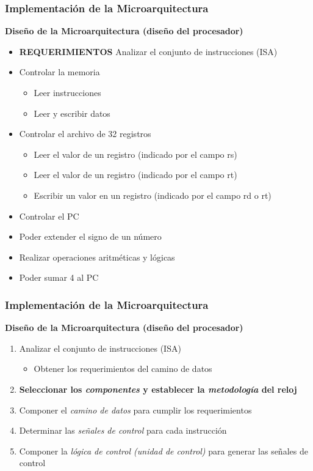 \documentclass[aspectratio=169,compress]{beamer}
\begin{document}
\begin{footnotesize}
\begin{frame}
\frametitle{Implementación de la Microarquitectura}
\begin{center}\textbf{Diseño de la Microarquitectura (diseño del procesador)}\end{center}
\begin{itemize}
\item \textbf{REQUERIMIENTOS} Analizar el conjunto de instrucciones (ISA)
\end{itemize}
\begin{itemize}
\item Controlar la memoria
\begin{itemize}
\item Leer instrucciones
\item Leer y escribir datos
\end{itemize}

\item Controlar el archivo de 32 registros
\begin{itemize}
\item Leer el valor de un registro (indicado por el campo rs)
\item Leer el valor de un registro (indicado por el campo rt)
\item Escribir un valor en un registro (indicado por el campo rd o rt)
\end{itemize}
\item Controlar el PC
\item Poder extender el signo de un número
\item Realizar operaciones aritméticas y lógicas
\item Poder sumar 4 al PC
\end{itemize}

\end{frame}




\begin{frame}
\frametitle{Implementación de la Microarquitectura}
\begin{center}\textbf{Diseño de la Microarquitectura (diseño del procesador)}\end{center}
\begin{enumerate}
\item Analizar el conjunto de instrucciones (ISA)
\begin{itemize}
\item Obtener los requerimientos del camino de datos
\end{itemize}
\item \textbf{Seleccionar los \textit{componentes} y establecer la \textit{metodología} del reloj}
\item Componer el \textit{camino de datos} para cumplir los requerimientos
\item Determinar las \textit{señales de control} para cada instrucción
\item Componer la \textit{lógica de control (unidad de control)} para generar las señales de control
\end{enumerate}
\end{frame}



\end{footnotesize}
\end{document}
